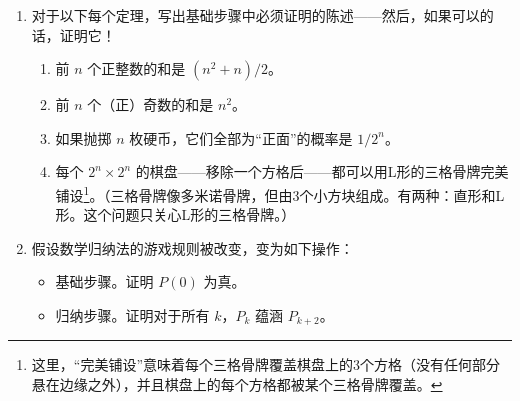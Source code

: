 \begin{enumerate}
    
    \wbvfill
    
    \workbookpagebreak
    \hintspagebreak
    
    \item 
    对于以下每个定理，写出基础步骤中必须证明的陈述——然后，如果可以的话，证明它！
    \begin{enumerate}
    \item 
    前 $n$ 个正整数的和是 $(n^2+n)/2$。
    
    \wbvfill
    
    \item 
    前 $n$ 个（正）奇数的和是 $n^2$。
    
    \wbvfill
    
    \item 
    如果抛掷 $n$ 枚硬币，它们全部为“正面”的概率是 $1/2^n$。
    
    \wbvfill
    
    \item
    
    每个 $2^n \times 2^n$ 的棋盘——移除一个方格后——都可以用L形的三格骨牌完美铺设\footnote{这里，“完美铺设”意味着每个三格骨牌覆盖棋盘上的3个方格（没有任何部分悬在边缘之外），并且棋盘上的每个方格都被某个三格骨牌覆盖。}。（三格骨牌像多米诺骨牌，但由3个小方块组成。有两种：直形和L形。这个问题只关心L形的三格骨牌。）
    \end{enumerate}
    
    
    \wbvfill
      
    \hintspagebreak
    \workbookpagebreak
    
    \item     
    假设数学归纳法的游戏规则被改变，变为如下操作：
    \begin{itemize}
    \item 基础步骤。证明 $P(0)$ 为真。
    \item 归纳步骤。证明对于所有 $k$，$P_k$ 蕴涵 $P_{k+2}$。
    \end{itemize}
    

\end{enumerate}
